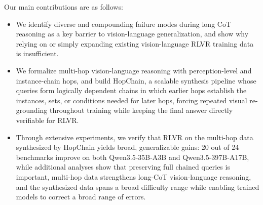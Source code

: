 \vspace{0.3em}
\noindent Our main contributions are as follows:
\begin{itemize}[leftmargin=1.5em, itemsep=2pt, topsep=2pt]
    \item We identify diverse and compounding failure modes during long CoT reasoning as a key barrier to vision-language generalization, and show why relying on or simply expanding existing vision-language RLVR training data is insufficient.
    \item We formalize multi-hop vision-language reasoning with perception-level and instance-chain hops, and build HopChain, a scalable synthesis pipeline whose queries form logically dependent chains in which earlier hops establish the instances, sets, or conditions needed for later hops, forcing repeated visual re-grounding throughout training while keeping the final answer directly verifiable for RLVR.
    \item Through extensive experiments, we verify that RLVR on the multi-hop data synthesized by HopChain yields broad, generalizable gains: 20 out of 24 benchmarks improve on both Qwen3.5-35B-A3B and Qwen3.5-397B-A17B, while additional analyses show that preserving full chained queries is important, multi-hop data strengthens long-CoT vision-language reasoning, and the synthesized data spans a broad difficulty range while enabling trained models to correct a broad range of errors.
\end{itemize}
